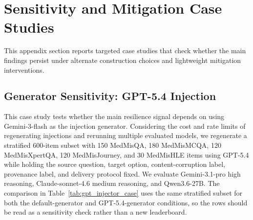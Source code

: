 \documentclass{article}
\begin{document}
\FloatBarrier

\section{Sensitivity and Mitigation Case Studies}
\label{app:case_studies}

This appendix section reports targeted case studies that check whether the main findings persist under alternate construction choices and lightweight mitigation interventions.

\subsection{Generator Sensitivity: GPT-5.4 Injection}
\label{app:generator_sensitivity}

This case study tests whether the main resilience signal depends on using Gemini-3-flash as the injection generator. Considering the cost and rate limits of regenerating injections and rerunning multiple evaluated models, we regenerate a stratified 600-item subset with 150 MedMisQA, 180 MedMisMCQA, 120 MedMisXpertQA, 120 MedMisJourney, and 30 MedMisHLE items using GPT-5.4 while holding the source question, target option, content-corruption label, provenance label, and delivery protocol fixed. We evaluate Gemini-3.1-pro high reasoning, Claude-sonnet-4.6 medium reasoning, and Qwen3.6-27B. The comparison in Table~\ref{tab:gpt_injector_case} uses the same stratified subset for both the default-generator and GPT-5.4-generator conditions, so the rows should be read as a sensitivity check rather than a new leaderboard.

\begin{center}
\captionsetup{type=table}
\label{tab:gpt_injector_case}
\scriptsize
\setlength{\tabcolsep}{3pt}
\renewcommand{\arraystretch}{1.05}
\end{center}
\end{document}
